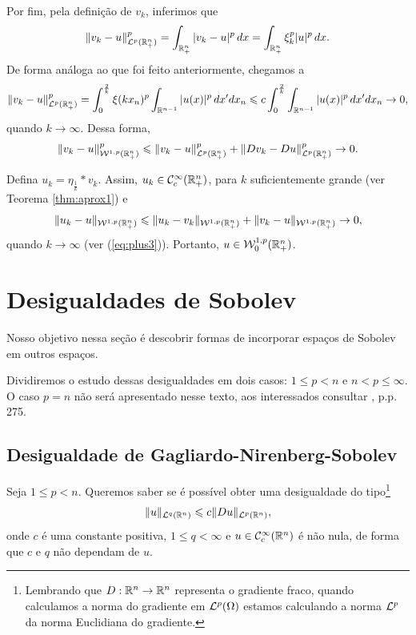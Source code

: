 \begin{prf}
    Por fim, pela definição de $v_k$, inferimos que
    \[
        \Vert v_k - u \Vert_{\mathcal{L}^p(\mathbb{R}^n_+)}^p = \int_{\mathbb{R}^n_+} |v_k - u|^p \,dx = \int_{\mathbb{R}^n_+} \xi^p_k|u|^p \,dx.
    \]
    De forma análoga ao que foi feito anteriormente, chegamos a
    \begin{equation} \label{eq:plus3}
        \Vert v_k - u \Vert_{\mathcal{L}^p(\mathbb{R}^n_+)}^p = \int_{0}^{\frac{2}{k}} \xi(kx_n)^p \int_{\mathbb{R}^{n-1}} |u(x)|^p \,dx'dx_n \leqslant c \int_{0}^{\frac{2}{k}} \int_{\mathbb{R}^{n-1}} |u(x)|^p \, dx'dx_n \to 0,
    \end{equation}
    quando $k \to \infty$. Dessa forma,
    \[
        \Vert v_k - u \Vert_{\mathcal{W}^{1,p}(\mathbb{R}^n_+)}^p \leqslant \Vert v_k - u \Vert_{\mathcal{L}^{p}(\mathbb{R}^n_+)}^p + \Vert Dv_k - Du \Vert_{\mathcal{L}^{p}(\mathbb{R}^n_+)}^p \to 0.
    \]

    Defina $u_k = \eta_{\frac{1}{k}} * v_k$. Assim, $u_k \in \mathcal{C}^{\infty}_c(\mathbb{R}^n_+)$, para $k$ suficientemente grande (ver Teorema \ref{thm:aprox1}) e 
    \[
        \Vert u_k - u \Vert_{\mathcal{W}^{1,p}(\mathbb{R}^n_+)} \leqslant \Vert u_k - v_k \Vert_{\mathcal{W}^{1,p}(\mathbb{R}^n_+)} + \Vert v_k - u \Vert_{\mathcal{W}^{1,p}(\mathbb{R}^n_+)} \to 0,
    \]
    quando $k \to \infty$ (ver (\ref{eq:plus3})).
    Portanto, $u \in \mathcal{W}^{1,p}_0(\mathbb{R}^n_+)$.
\end{prf}

\section{Desigualdades de Sobolev}

Nosso objetivo nessa seção é descobrir formas de incorporar espaços de Sobolev em outros espaços.

Dividiremos o estudo dessas desigualdades em dois casos: $1 \leqslant p < n$ e $n < p \leqslant \infty$.
O caso $p = n$ não será apresentado nesse texto, aos interessados consultar \cite{evans-pde}, p.p. 275.

\subsection{Desigualdade de Gagliardo-Nirenberg-Sobolev}

Seja $1 \leqslant p < n$.
Queremos saber se é possível obter uma desigualdade do tipo\footnote{
    Lembrando que $D : \mathbb{R}^n \to \mathbb{R}^n$ representa o gradiente fraco, quando calculamos a norma do gradiente em $\mathcal{L}^p(\Omega)$ estamos calculando a norma $\mathcal{L}^p$ da norma Euclidiana do gradiente.
}
\begin{equation} \label{eq:quase-gns}
    \Vert u \Vert_{\mathcal{L}^q(\mathbb{R}^n)} \leqslant c \Vert Du \Vert_{\mathcal{L}^p(\mathbb{R}^n)},
\end{equation}
onde $c$ é uma constante positiva, $1 \leqslant q < \infty$ e $u \in \mathcal{C}^\infty_c(\mathbb{R}^n)$ é não nula, de forma que $c$ e $q$ não dependam de $u$.

